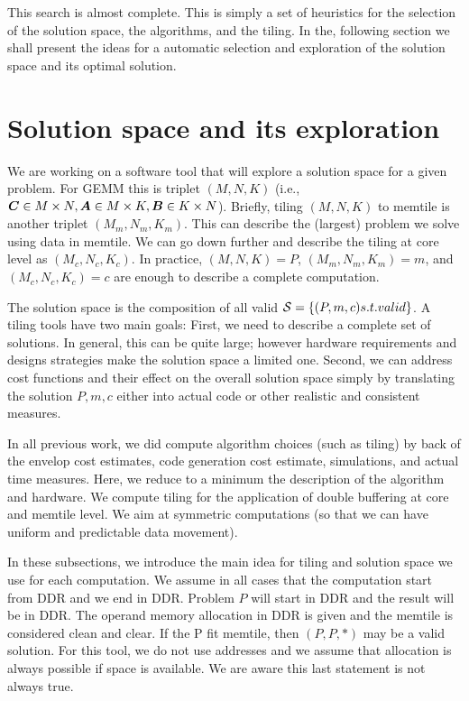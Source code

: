 \documentclass[journal]{IEEEtran}
\begin{document}
This search is almost complete. This is simply a set of heuristics for
the selection of the solution space, the algorithms, and the tiling.
In the, following section we shall present the ideas for a automatic
selection and exploration of the solution space and its optimal solution.




\section{Solution space and its exploration}
We are working on a software tool that will explore a solution space
for a given problem. For GEMM this is triplet $(M,N,K)$ (i.e., ${\boldsymbol C}
\in M \times N, {\boldsymbol A} \in M \times K, {\boldsymbol B} \in K \times N$). Briefly,
  tiling $(M,N,K)$ to memtile is another triplet $(M_m,N_m,K_m)$. This
  can describe the (largest) problem we solve using data in
  memtile. We can go down further and describe the tiling at core
  level as $(M_c,N_c,K_c)$. In practice, $(M,N,K)=P$,
  $(M_m,N_m,K_m)=m$, and $(M_c,N_c,K_c)=c$ are enough to describe a
  complete computation.

The solution space is the composition of all valid ${\cal S}= \{
(P,m,c) \mbox{ s.t. valid}\}$. A tiling tools have two main goals:
First, we need to describe a complete set of solutions. In general,
this can be quite large; however hardware requirements and designs
strategies make the solution space a limited one. Second, we can address
cost functions and their effect on the overall solution space simply
by translating the solution $P,m,c$ either into actual code or other
realistic and consistent measures.

In all previous work, we did compute algorithm choices (such as
tiling) by back of the envelop cost estimates, code generation cost
estimate, simulations, and actual time measures. Here, we reduce to a
minimum the description of the algorithm and hardware. We compute
tiling for the application of double buffering at core and memtile
level. We aim at symmetric computations (so that we can have uniform
and predictable data movement).

In these subsections, we introduce the main idea for tiling and
solution space we use for each computation. We assume in all cases
that the computation start from DDR and we end in DDR. Problem $P$
will start in DDR and the result will be in DDR. The operand memory
allocation in DDR is given and the memtile is considered clean and
clear. If the P fit memtile, then $(P,P,*)$ may be a valid
solution. For this tool, we do not use addresses and we assume that
allocation is always possible if space is available. We are aware this
last statement is not always true.
\end{document}
